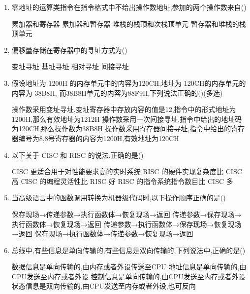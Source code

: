\documentclass[12pt, a4paper, oneside, UTF8]{ctexbook}
\begin{document}
\begin{enumerate}
    \item 零地址的运算类指令在指令格式中不给出操作数地址,参加的两个操作数来自(\qquad)
    \begin{choices}[1]
    \task 累加器和寄存器
    \task 累加器和暂存器
    \task 堆栈的栈顶和次栈顶单元
    \task 暂存器和堆栈的栈顶单元
    \end{choices}

    \item 偏移量存储在寄存器中的寻址方式为(\qquad)
    \begin{choices}[2]
    \task 变址寻址
    \task 基址寻址
    \task 相对寻址
    \task 间接寻址
    \end{choices}

    \item 假设地址为 1200H 的内存单元中的内容为120CH,地址为 120CH的内存单元的内容为 38B8H,
    而38B8H单元的内容为88F9H,下列说法正确的(\qquad)(多选)
    \begin{choices}[1]
        \task 操作数采用变址寻址,变址寄存器中存放内容的值是12,指令中的形式地址为1200H,那么有效地址为1212H 
        \task 操作数采用一次间接寻址,指令中给出的地址码为120CH,那么操作数为38B8H
        \task 操作数采用寄存器间接寻址,指令中给出的寄存器编号为8,8号寄存器的内容为1200H,有效地址为120CH
    \end{choices}

    \item 以下关于 CISC 和 RISC 的说法,正确的是(\qquad)
    \begin{choices}[1]
    \task CISC 更适合用于对性能要求高的实时系统
    \task RISC 的硬件实现复杂度比 CISC 高
    \task CISC 的编程灵活性比 RISC 好
    \task RISC 的指令系统指令数目比 CISC 多
    \end{choices}

    \item 当高级语言中的函数调用转换为机器级代码时,以下操作顺序正确的是(\qquad)
    \begin{choices}[1]
    \task 保存现场→传递参数→执行函数体→恢复现场→返回
    \task 传递参数→保存现场→执行函数体→恢复现场→返回
    \task 传递参数→执行函数体→保存现场→恢复现场→返回
    \task 保存现场→执行函数体→传递参数→恢复现场→返回
    \end{choices}


    \item 总线中,有些信息是单向传输的,有些信息是双向传输的,下列说法中,正确的是(\qquad)
    \begin{choices}[1]
    \task 数据信息是单向传输的,由内存或者外设传送至CPU
    \task 地址信息是单向传输的,由CPU发送至内存或者外设
    \task 控制信息是单向传输的,由CPU发送至内存或者外设
    \task 状态信息是双向传输的,由CPU发送至内存或者外设,也可反向
    \end{choices}


\end{enumerate}
\end{document}
